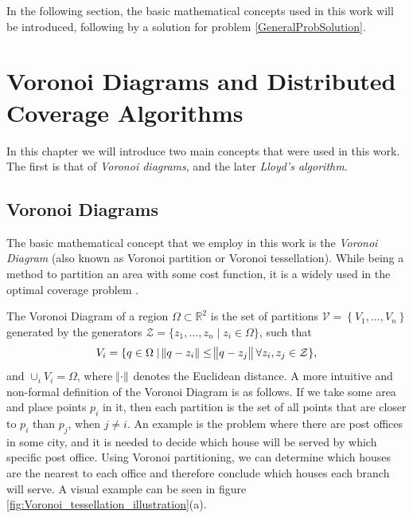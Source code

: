 \documentclass{iacas}
\newcommand{\rsqr}{\mathbb{R}^2}
\begin{document}
In the following section, the basic mathematical concepts used in this work will be introduced, following by a solution for problem \ref{GeneralProbSolution}.

\section{Voronoi Diagrams and Distributed Coverage Algorithms}
In this chapter we will introduce two main concepts that were used in this work. The first is that of \emph{Voronoi diagrams}, and the later \emph{Lloyd's algorithm}.
\subsection{Voronoi Diagrams}
The basic mathematical concept that we employ in this work is the \emph{Voronoi Diagram} (also known as Voronoi partition or Voronoi tessellation). While being a method to partition an area with some cost function, it is a widely used in the optimal coverage problem \cite{Cortes2004,Hussein2007, Du1999}. 
%

The Voronoi Diagram of a region $\Omega \subset \rsqr$ is the set of partitions $\mathcal{V} = \left\{V_{1}, \ldots, V_n\right\}$ %
generated by the generators $\mathcal{Z} = \{z_1,\ldots,z_n\mid z_{i} \in \Omega\}$, such that
\begin{equation} \label{Voronoi Definition}
V_{i} = \{q\in\Omega \mid \norm{q - z_i} \leq \norm{q - z_j} \forall z_i,z_j\in\mathcal{Z}\},
\end{equation}
and $\cup_i V_i = \Omega$, where %
$\norm{\cdot}$ denotes the Euclidean distance.
%
A more intuitive and non-formal definition of the Voronoi Diagram is as follows. If we take some area and place points $p_i$ in it, then each partition is the set of all points that are closer to $p_i$ than $p_j$, when $j \neq i$. An example is the problem where there are post offices in some city, and it is needed to decide which house will be served by which specific post office. Using Voronoi partitioning, we can determine which houses are the nearest to each office and therefore conclude which houses each branch will serve. A visual example can be seen in figure \ref{fig:Voronoi_tessellation_illustration}(a).
\end{document}
